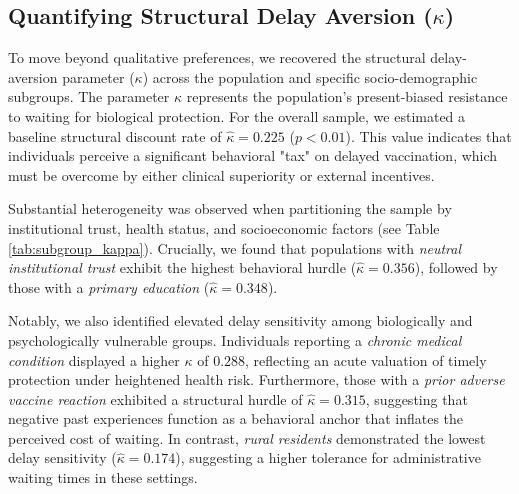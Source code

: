 \subsection{Quantifying Structural Delay Aversion ($\kappa$)}

To move beyond qualitative preferences, we recovered the structural delay-aversion parameter ($\kappa$) across the population and specific socio-demographic subgroups. The parameter $\kappa$ represents the population's present-biased resistance to waiting for biological protection. For the overall sample, we estimated a baseline structural discount rate of $\hat{\kappa} = 0.225$ ($p < 0.01$). This value indicates that individuals perceive a significant behavioral "tax" on delayed vaccination, which must be overcome by either clinical superiority or external incentives.

Substantial heterogeneity was observed when partitioning the sample by institutional trust, health status, and socioeconomic factors (see Table \ref{tab:subgroup_kappa}). Crucially, we found that populations with \textit{neutral institutional trust} exhibit the highest behavioral hurdle ($\hat{\kappa} = 0.356$), followed by those with a \textit{primary education} ($\hat{\kappa} = 0.348$). 

Notably, we also identified elevated delay sensitivity among biologically and psychologically vulnerable groups. Individuals reporting a \textit{chronic medical condition} displayed a higher $\kappa$ of $0.288$, reflecting an acute valuation of timely protection under heightened health risk. Furthermore, those with a \textit{prior adverse vaccine reaction} exhibited a structural hurdle of $\hat{\kappa} = 0.315$, suggesting that negative past experiences function as a behavioral anchor that inflates the perceived cost of waiting. In contrast, \textit{rural residents} demonstrated the lowest delay sensitivity ($\hat{\kappa} = 0.174$), suggesting a higher tolerance for administrative waiting times in these settings.


